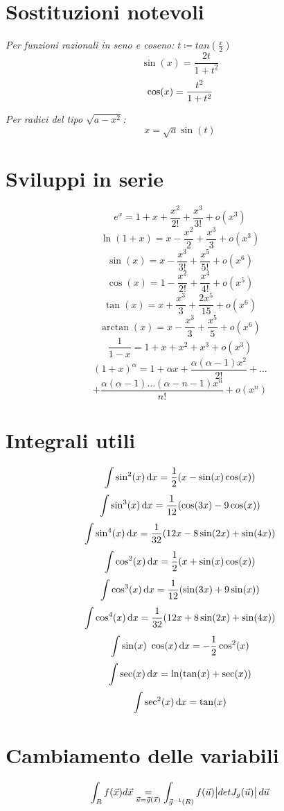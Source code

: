 \documentclass[a4paper,portrait,columns=3,5pt]{cheatsheet}
\begin{document}
\section{Sostituzioni notevoli}
\textit{Per funzioni razionali in seno e coseno:} $t \coloneqq tan(\frac{x}{2}) $
$$ \sin(x) = \frac{2t}{1+t^2}$$
$$ \cos(x) = \frac{\-t^2}{1+t^2}$$

\textit{Per radici del tipo $\sqrt{a - x^2}$:}
$$ x = \sqrt{a} \sin(t) $$

\section{Sviluppi in serie}
$$ e^x = 1 + x + \frac{x^2}{2!} + \frac{x^3}{3!} + o(x^3)$$
$$ \ln(1 + x) = x - \frac{x^2}{2} + \frac{x^3}{3} + o(x^3)$$
$$ \sin(x) = x - \frac{x^3}{3!} + \frac{x^5}{5!} + o(x^6)$$
$$ \cos(x) = 1 - \frac{x^2}{2!} + \frac{x^4}{4!} + o(x^5)$$
$$ \tan(x) = x + \frac{x^3}{3} + \frac{2x^5}{15} + o(x^6)$$
$$ \arctan(x) = x - \frac{x^3}{3} + \frac{x^5}{5} + o(x^6)$$
$$ \frac{1}{1-x} = 1 + x + x^2 + x^3 + o(x^3)$$
$$(1 + x) ^ \alpha = 1 + \alpha x + \frac{\alpha (\alpha - 1)x^2}{2!} + \dots $$
$$ + \frac{\alpha(\alpha - 1)\dots (\alpha - n - 1) x^n}{n!} + o(x^n) $$

\section{Integrali utili}
$$ \int \sin^2(x) \dif x = \frac{1}{2} (x - \sin(x) \cos(x)) $$
$$ \int \sin^3(x) \dif x = \frac{1}{12} (\cos(3x)-9\cos(x)) $$
$$ \int \sin^4(x) \dif x = \frac{1}{32} (12x - 8\sin(2x)+\sin(4x)) $$
$$ \int \cos^2(x) \dif x = \frac{1}{2} (x + \sin(x)\cos(x)) $$
$$ \int \cos^3(x) \dif x = \frac{1}{12} (\sin(3x) + 9\sin(x))$$
$$ \int \cos^4(x) \dif x = \frac{1}{32} (12 x + 8\sin(2x)+\sin(4x))$$
$$ \int \sin(x) ~ \cos(x) \dif x = -\frac{1}{2} \cos^2(x) $$ 
$$ \int \sec(x) \dif x = \ln (\tan(x) + \sec(x)) $$
$$ \int \sec^2(x) \dif x = \tan(x) $$
\section{Cambiamento delle variabili}
\begin{equation*}
	\int_R f(\vec {x}) d\vec{x} \underset{{\vec{u} = \vec{g} (\vec{x})}}{=} \int_{\vec{g}^{-1}(R)} f(\vec {u}) \abs{det J_g(\vec u)} d\vec{u}
\end{equation*}
\end{document}
